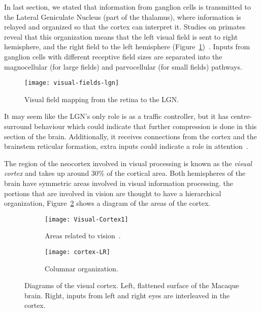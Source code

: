 In last section, we stated that information from ganglion cells is transmitted to the Lateral Geniculate Nucleus (part of the thalamus), where information is relayed and organized so that the cortex can interpret it. Studies on primates reveal that this organization means that the left visual field is sent to right hemisphere, and the right field to the left hemisphere (Figure~\ref{fig:vision:optic-chiasm})~\cite{thompson2000brain}. Inputs from ganglion cells with different receptive field sizes are separated into the magnocellular (for large fields) and parvocellular (for small fields) pathways.

\begin{figure}[h]
  \begin{center}
    \texttt{[image: visual-fields-lgn]}
    \caption{Visual field mapping from the retina to the LGN.}
    \label{fig:vision:optic-chiasm}
  \end{center}
\end{figure}

It may seem like the LGN's only role is as a traffic controller, but it has centre-surround behaviour which could indicate that further compression is done in this section of the brain. Additionally, it receives connections from the cortex and the brainstem reticular formation, extra inputs could indicate a role in attention~\cite{eye-brain-vision-hubel1995}.

The region of the neocortex involved in visual processing is known as the \emph{visual cortex} and takes up around 30\% of the cortical area. Both hemispheres of the brain have symmetric areas involved in visual information processing. the portions that are involved in vision are thought to have a hierarchical organization, Figure~\ref{fig:vision:visual-cortex} shows a diagram of the areas of the cortex.

\begin{figure}[h]
  \begin{center}
    \begin{subfigure}[b]{0.65\textwidth}
      \texttt{[image: Visual-Cortex1]}
      \caption{Areas related to vision~\cite{webvision-images}.}
      \label{fig:vision:visual-cortex}
    \end{subfigure}
    \begin{subfigure}[b]{0.34\textwidth}
      \texttt{[image: cortex-LR]}
      \caption{Columnar organization.}
      \label{fig:vision:visual-cortex-LR}
    \end{subfigure}
    \caption{Diagrams of the visual cortex. Left, flattened surface of the Macaque brain. Right, inputs from left and right eyes are interleaved in the cortex. }
  \end{center}
\end{figure}

